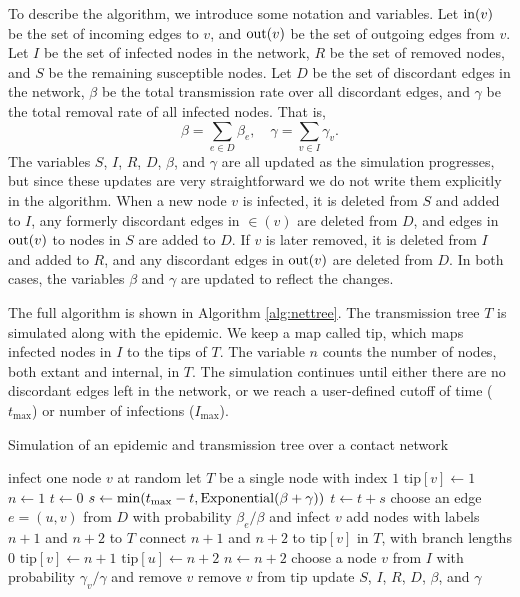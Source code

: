 To describe the algorithm, we introduce some notation and variables. Let
$\operatorname{in}(v)$ be the set of incoming edges to $v$, and $\operatorname{out}(v)$ be the set of
outgoing edges from $v$. Let $I$ be the set of infected nodes in the network,
$R$ be the set of removed nodes, and $S$ be the remaining susceptible nodes.
Let $D$ be the set of discordant edges in the network, $\beta$ be the 
total transmission rate over all discordant edges, and $\gamma$ be the total
removal rate of all infected nodes. That is,
\[
  \beta = \sum_{e \in D} \beta_e, \quad
  \gamma = \sum_{v \in I} \gamma_v.
\]
The variables $S$, $I$, $R$, $D$, $\beta$, and $\gamma$ are all updated as the
simulation progresses, but since these updates are very straightforward we do
not write them explicitly in the algorithm. When a new node $v$ is infected, it
is deleted from $S$ and added to $I$, any formerly discordant edges in $\in(v)$
are deleted from $D$, and edges in $\operatorname{out}(v)$ to nodes in $S$ are added to $D$.
If $v$ is later removed, it is deleted from $I$ and added to $R$, and any
discordant edges in $\operatorname{out}(v)$ are deleted from $D$. In both cases, the
variables $\beta$ and $\gamma$ are updated to reflect the changes. 

\newcommand{\tip}{\mathrm{tip}}

The full algorithm is shown in Algorithm \ref{alg:nettree}. The transmission
tree $T$ is simulated along with the epidemic. We keep a map called $\tip$,
which maps infected nodes in $I$ to the tips of $T$. The variable $n$ counts
the number of nodes, both extant and internal, in $T$. The simulation continues
until either there are no discordant edges left in the network, or we reach a
user-defined cutoff of time ($t_{\max}$) or number of infections ($I_{\max}$). 

\begin{algorithm}
  \label{alg:nettree}
  \caption{Simulation of an epidemic and transmission tree over a contact network}
  \begin{algorithmic}
    \State infect one node $v$ at random
    \State let $T$ be a single node with index $1$
    \State $\tip[v] \gets 1$
    \State $n \gets 1$
    \State $t \gets 0$
      \State $s \gets \min(t_{\max} - t, \operatorname{Exponential}(\beta + \gamma))$
      \For{$v \in \tip$}
        \State{extend the branch length of $\tip[v]$ by $s$}
      \EndFor
      \State $t \gets t + s$
          \State choose an edge $e = (u, v)$ from $D$ with probability $\beta_e / \beta$
                 and infect $v$
          \State add nodes with labels $n+1$ and $n+2$ to $T$
          \State connect $n+1$ and $n+2$ to $\tip[v]$ in $T$, with branch lengths $0$
          \State $\tip[v] \gets n + 1$
          \State $\tip[u] \gets n + 2$
          \State $n \gets n + 2$
        \Else
          \State choose a node $v$ from $I$ with probability $\gamma_v / \gamma$
                 and remove $v$
          \State remove $v$ from $\tip$
        \EndIf
        \State update $S$, $I$, $R$, $D$, $\beta$, and $\gamma$
      \EndIf
    \EndWhile
  \end{algorithmic}
\end{algorithm}

